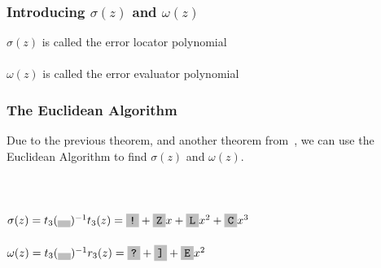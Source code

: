 \documentclass{beamer}
\begin{document}
\begin{frame}
	\frametitle{Introducing $\sigma(z)$ and $\omega(z)$}
    $\sigma(z)$ is called the error locator polynomial\\~\\
    $\omega(z)$ is called the error evaluator polynomial

\end{frame}

\begin{frame}
	\frametitle{The Euclidean Algorithm}
    Due to the previous theorem, and another theorem from~\cite{Hall:2012}, we can use the Euclidean Algorithm to find $\sigma(z)$ and $\omega(z)$.\\~\\
    
     \\~\\
    
    $\sigma(z) = t_{3}(\f{ })^{-1} t_{3}(z) = \f{!} + \f{Z}x + \f{L}x^2 + \f{C}x^3$\\~\\
    $\omega(z) = t_{3}(\f{ })^{-1} r_{3}(z) = \f{?} + \f{]} + \f{E}x^{2}$\\~\\
    

\end{frame}
\end{document}
